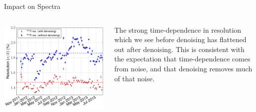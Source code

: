\documentclass[final]{beamer} %
\begin{document}
\begin{frame}{}
\begin{columns}[t]
\begin{column}{.3\linewidth}
\begin{block}{Impact on Spectra}
      \begin{columns}
        \begin{column}{0.63\textwidth}
          \includegraphics[keepaspectratio=true,width=\textwidth]{RotatedReso_denoised_compVsTime.pdf}
        \end{column}
        \begin{column}{0.37\textwidth}
          The strong time-dependence in resolution which we see before denoising has flattened out after denoising.  This is consistent with the expectation that time-dependence comes from noise, and that denoising removes much of that noise.
        \end{column}
      \end{columns}


\end{block}
\end{column}
\end{columns}
\end{frame}
\end{document}
